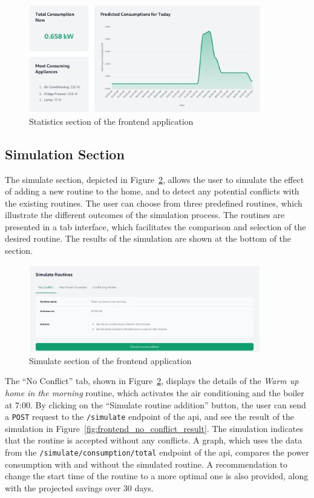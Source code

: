\begin{figure}
    \centering
    \includegraphics[width=0.9\textwidth]{images/frontend/statistics.png}
    \caption{Statistics section of the frontend application}%
    \label{fig:frontend_statistics}
\end{figure}

\subsection{Simulation Section}

The simulate section, depicted in Figure~\ref{fig:frontend_simulate}, allows the user to simulate the effect of adding a new routine to the home, and to detect any potential conflicts with the existing routines. The user can choose from three predefined routines, which illustrate the different outcomes of the simulation process. The routines are presented in a tab interface, which facilitates the comparison and selection of the desired routine. The results of the simulation are shown at the bottom of the section.

\begin{figure}
    \centering
    \includegraphics[width=0.9\textwidth]{images/frontend/simulate.png}
    \caption{Simulate section of the frontend application}%
    \label{fig:frontend_simulate}
\end{figure}

The ``No Conflict'' tab, shown in Figure~\ref{fig:frontend_simulate}, displays the details of the \textit{Warm up home in the morning} routine, which activates the air conditioning and the boiler at 7:00. By clicking on the ``Simulate routine addition'' button, the user can send a \texttt{POST} request to the \texttt{/simulate} endpoint of the \acrshort{api}, and see the result of the simulation in Figure~\ref{fig:frontend_no_conflict_result}. The simulation indicates that the routine is accepted without any conflicts. A graph, which uses the data from the \texttt{/simulate/consumption/total} endpoint of the \acrshort{api}, compares the power consumption with and without the simulated routine. A recommendation to change the start time of the routine to a more optimal one is also provided, along with the projected savings over 30 days.

